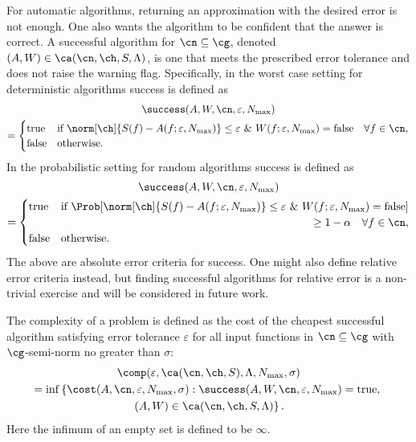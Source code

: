 \documentclass[final]{elsarticle}
\theoremstyle{definition}
\theoremstyle{remark}
\begin{document}
For automatic algorithms, returning an approximation with the desired error is not enough.  One also wants the algorithm to be confident that the answer is correct.  A successful algorithm for $\cn \subseteq \cg$, denoted $(A,W) \in \ca(\cn,\ch,S,\Lambda)$, is one that meets the prescribed error tolerance and does not raise the warning flag.  Specifically, in the worst case setting for deterministic algorithms success is defined as
\begin{multline*}
\success(A,W,\cn,\varepsilon,N_{\max}) \\
= \begin{cases} \text{true} & \text{if } \displaystyle \norm[\ch]{S(f)-A(f;\varepsilon,N_{\max})} \le \varepsilon \ \& \ W(f;\varepsilon,N_{\max})=\text{false} \quad \forall  f \in \cn, \\
\displaystyle \text{false} & \text{otherwise}.
\end{cases}
\end{multline*}
In the probabilistic setting for random algorithms success is defined as
\begin{multline*}
\success(A,W,\cn,\varepsilon,N_{\max}) \\
= \begin{cases} \text{true} & \text{if } \displaystyle \Prob[\norm[\ch]{S(f)-A(f;\varepsilon,N_{\max})} \le \varepsilon  \ 
\& \ W(f;\varepsilon,N_{\max})=\text{false}] \\
& \hfill \ge 1 - \alpha \quad \forall  f \in \cn, \\
\displaystyle \text{false} & \text{otherwise}.
\end{cases}
\end{multline*}
The above are absolute error criteria for success.  One might also define relative error criteria instead, but finding successful algorithms for relative error is a non-trivial exercise and will be considered in future work.

The complexity of a problem is defined as the cost of the cheapest successful algorithm satisfying error tolerance $\varepsilon$ for all input functions in $\cn \subseteq \cg$ with $\cg$-semi-norm no greater than $\sigma$:
\begin{multline} \label{complexdef}
\comp(\varepsilon,\ca(\cn,\ch,S),\Lambda,N_{\max},\sigma) \\
 = \inf\left\{\cost(A,\cn,\varepsilon,N_{\max},\sigma) : \success(A,W,\cn,\varepsilon,N_{\max}) = \text{true}, \right .\\
\left.  (A,W) \in \ca(\cn,\ch,S,\Lambda) \right \}.
\end{multline}
Here the infimum of an empty set is defined to be $\infty$.
\end{document}
